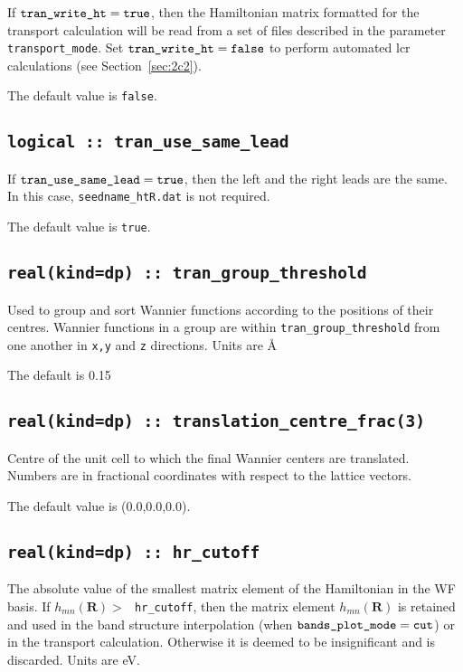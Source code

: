 If $\verb#tran_write_ht#=\verb#true#$, then the Hamiltonian matrix
formatted for the transport calculation will be read
from a set of files described in the
parameter \verb#transport_mode#. 
Set $\verb#tran_write_ht#=\verb#false#$ to perform automated 
lcr calculations (see Section~\ref{sec:2c2}).

The default value is {\tt false}.

\subsection[tran\_use\_same\_lead]{\tt logical :: tran\_use\_same\_lead}

If $\verb#tran_use_same_lead#=\verb#true#$, then the
left and the right leads are the same. In this case, 
\verb#seedname_htR.dat# is not required.

The default value is {\tt true}.

\subsection[tran\_group\_threshold]{\tt real(kind=dp) :: tran\_group\_threshold}

Used to group and sort Wannier functions according to the positions of their centres.
Wannier functions in a group are within \verb#tran_group_threshold#
from one another in \verb#x,y# and \verb#z# directions. Units are \AA

The default is 0.15

\subsection[translation\_centre\_frac]{\tt real(kind=dp) :: translation\_centre\_frac(3)}

Centre of the unit cell to which the final Wannier centers are
translated. Numbers are in fractional coordinates with respect to the
lattice vectors.
 
The default value is (0.0,0.0,0.0).

\subsection[hr\_cutoff]{\tt real(kind=dp) :: hr\_cutoff}

The absolute value of the smallest matrix element of the
Hamiltonian in the WF basis.
If $h_{mn}(\mathbf{R})>\:${\tt
  hr\_cutoff}, then the matrix element
$h_{mn}(\mathbf{R})$ is retained and used in
the band structure interpolation (when $\verb#bands_plot_mode#=\verb#cut#$)
or in the transport calculation.
Otherwise it is deemed to be insignificant
and is discarded. Units are eV.


